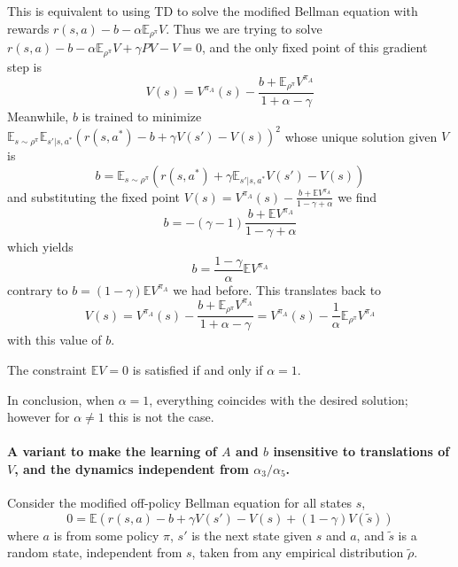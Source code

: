 \documentclass[11pt]{article}
\newcommand{\E}{\mathbb{E}}
\begin{document}
This is equivalent to using TD
to solve the modified Bellman equation with
rewards $r(s,a)-b-\alpha \E_{\rho^\pi}V$. Thus we are trying to solve
$r(s,a)-b-\alpha \E_{\rho^\pi}V+\gamma PV-V=0$, and the only fixed point
of this gradient step is
\begin{equation}
V(s)=V^{\pi_A}(s)-\frac{b+\E_{\rho^\pi} V^{\pi_A}}{1+\alpha-\gamma}
\end{equation}
Meanwhile, $b$ is trained to minimize $\E_{s\sim
\rho^\pi}\E_{s'|s,a^\ast}
(r(s,a^\ast)-b+\gamma V(s')-V(s))^2$ whose unique
solution given $V$ is 
\begin{equation}
b=\E_{s\sim \rho^\pi}(r(s,a^\ast)+\gamma \E_{s'|s,a^\ast}V(s')-V(s))
\end{equation}
and substituting the fixed point
$V(s)=V^{\pi_A}(s)-\frac{b+\E V^{\pi_A}}{1-\gamma+\alpha}$ we find
\begin{equation}
b=-(\gamma-1) \frac{b+\E V^{\pi_A}}{1-\gamma+\alpha}
\end{equation}
which yields
\begin{equation}
b=\frac{1-\gamma}{\alpha} \E V^{\pi_A}
\end{equation}
contrary to $b=(1-\gamma)\E V^{\pi_A}$ we had before. 
This translates back to
\begin{equation}
V(s)=V^{\pi_A}(s)-\frac{b+\E_{\rho^\pi} V^{\pi_A}}{1+\alpha-\gamma}
=V^{\pi_A}(s)-\frac1\alpha \E_{\rho^\pi} V^{\pi_A}
\end{equation}
with this value of $b$.

The constraint $\E V=0$ is satisfied if and only if $\alpha=1$.

In conclusion, when $\alpha=1$, everything coincides with the desired
solution; however for $\alpha\neq 1$ this is not the case.

\paragraph{A variant to make the learning of $A$ and $b$ insensitive to
translations of $V$, and the dynamics independent from
$\alpha_3/\alpha_5$.} Consider the modified off-policy Bellman equation
for all states $s$,
\begin{equation}
0=\E \left(
r(s,a)-b+\gamma V(s')-V(s)+(1-\gamma)V(\tilde s)
\right)
\end{equation}
where $a$ is from some policy $\pi$, $s'$ is the next state given $s$ and
$a$, and $\tilde s$ is a random state, independent from $s$, taken from any empirical
distribution $\tilde \rho$.
\end{document}
